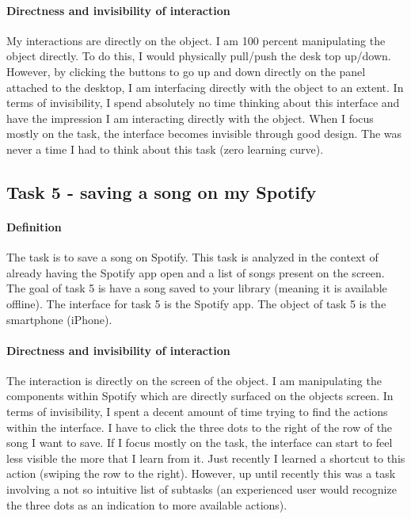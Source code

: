 \paragraph{Directness and invisibility of interaction}
My interactions are directly on the object. I am 100 percent manipulating the object directly. To do this, I would physically pull/push the desk top up/down. However, by clicking the buttons to go up and down directly on the panel attached to the desktop, I am interfacing directly with the object to an extent. In terms of invisibility, I spend absolutely no time thinking about this interface and have the impression I am interacting directly with the object. When I focus mostly on the task, the interface becomes invisible through good design. The was never a time I had to think about this task (zero learning curve).

\subsection{Task 5 - saving a song on my Spotify}

\paragraph{Definition}
The task is to save a song on Spotify. This task is analyzed in the context of already having the Spotify app open and a list of songs present on the screen. The goal of task 5 is have a song saved to your library (meaning it is available offline). The interface for task 5 is the Spotify app. The object of task 5 is the smartphone (iPhone).

\paragraph{Directness and invisibility of interaction}
The interaction is directly on the screen of the object. I am manipulating the components within Spotify which are directly surfaced on the objects screen. In terms of invisibility, I spent a decent amount of time trying to find the actions within the interface. I have to click the three dots to the right of the row of the song I want to save. If I focus mostly on the task, the interface can start to feel less visible the more that I learn from it. Just recently I learned a shortcut to this action (swiping the row to the right). However, up until recently this was a task involving a not so intuitive list of subtasks (an experienced user would recognize the three dots as an indication to more available actions).

